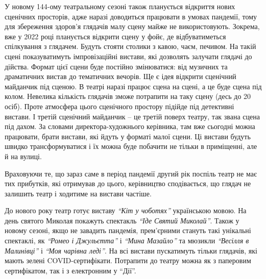 У новому 144-ому театральному сезоні також планується відкриття нових сценічних
просторів, адже наразі доводиться працювати в умовах пандемії, тому для
збереження здоров'я глядачів малу сцену майже не використовують. Зокрема, вже у
2022 році планується відкрити сцену у фойє, де відбуватиметься спілкування з
глядачем. Будуть стояти столики з кавою, чаєм, печивом. На такій сцені
показуватимуть імпровізаційні вистави, які дозволять залучати глядачі до
дійства. Формат цієї сцени буде постійно змінюватися: від музичних та
драматичних вистав до тематичних вечорів. Ще є ідея відкрити сценічний
майданчик під сценою. В театрі наразі працює сцена на сцені, а це буде сцена
під колом. Невелика кількість глядачів зможе потрапити на таку сцену (десь до
20 осіб). Проте атмосфера цього сценічного простору підійде під детективні
вистави. І третій сценічний майданчик – це третій поверх театру, так звана
сцена під дахом. За словами директора-художнього керівника, там вже сьогодні
можна працювати, брати вистави, які йдуть у форматі малої сцени. Ці вистави
будуть швидко трансформуватися і їх можна буде побачити не тільки в приміщенні,
але й на вулиці.


Враховуючи те, що зараз саме в період пандемії другий рік поспіль театр не має
тих прибутків, які отримував до цього, керівництво сподівається, що глядач не
залишить театр і ходитиме на вистави частіше.

До нового року театр готує виставу \emph{\enquote{Кіт у чоботях}} українською мовою. На день
святого Миколая покажуть спектакль \emph{\enquote{Іде Святий Миколай}}. Також у новому сезоні,
якщо не завадить пандемія, прем'єрними стануть такі унікальні спектаклі, як
\emph{\enquote{Ромео і Джульєтта}} і \emph{\enquote{Мина Мазайло}} та мюзикли \emph{\enquote{Весілля в Малинівці}} і \emph{\enquote{Моя
чарівна леді}}. На всі вистави пускатимуть тільки глядачів, які мають зелені
COVID-сертифікати. Потрапити до театру можна як з паперовим сертифікатом, так і
з електронним у \enquote{Дії}.
